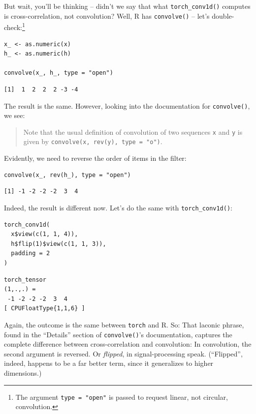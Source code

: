 \documentclass[
  letterpaper,
]{krantz}
\begin{document}
But wait, you'll be thinking -- didn't we say that what
\texttt{torch\_conv1d()} computes is cross-correlation, not convolution?
Well, R has \texttt{convolve()} -- let's double-check:\footnote{The
  argument \texttt{type\ =\ "open"} is passed to request linear, not
  circular, convolution.}

\begin{verbatim}
x_ <- as.numeric(x)
h_ <- as.numeric(h)

convolve(x_, h_, type = "open")
\end{verbatim}

\begin{verbatim}
[1]  1  2  2  2 -3 -4
\end{verbatim}

The result is the same. However, looking into the documentation for
\texttt{convolve()}, we see:

\begin{quote}
Note that the usual definition of convolution of two sequences
\texttt{x} and \texttt{y} is given by
\texttt{convolve(x,\ rev(y),\ type\ =\ "o")}.
\end{quote}

Evidently, we need to reverse the order of items in the filter:

\begin{verbatim}
convolve(x_, rev(h_), type = "open")
\end{verbatim}

\begin{verbatim}
[1] -1 -2 -2 -2  3  4
\end{verbatim}

Indeed, the result is different now. Let's do the same with
\texttt{torch\_conv1d()}:

\begin{verbatim}
torch_conv1d(
  x$view(c(1, 1, 4)),
  h$flip(1)$view(c(1, 1, 3)),
  padding = 2
)
\end{verbatim}

\begin{verbatim}
torch_tensor
(1,.,.) = 
 -1 -2 -2 -2  3  4
[ CPUFloatType{1,1,6} ]
\end{verbatim}

Again, the outcome is the same between \texttt{torch} and R. So: That
laconic phrase, found in the ``Details'' section of
\texttt{convolve()}'s documentation, captures the complete difference
between cross-correlation and convolution: In convolution, the second
argument is reversed. Or \emph{flipped}, in signal-processing speak.
(``Flipped'', indeed, happens to be a far better term, since it
generalizes to higher dimensions.)
\end{document}

